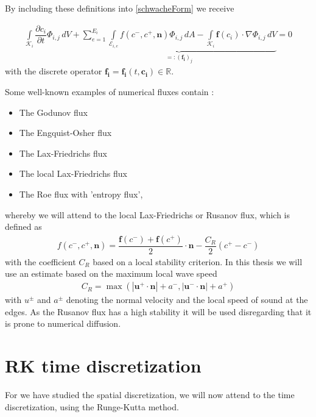 		By including these definitions into \eqref{schwacheForm} we receive
		
		\begin{align}
			\int\limits_{\mathcal{K}_i} \dfrac{\partial c_i}{\partial t}\Phi_{i,j} \, dV +
			\underbrace{\sum_{e=1}^{E_i}\int\limits_{\mathcal{E}_{i,e}} f \left( c^-, c^+, \mathbf{n} \right) \Phi_{i,j} \, dA - \int\limits_{\mathcal{K}_i} \boldsymbol{f}\left(c_i\right) \cdot \nabla\Phi_{i,j} \, dV}_{=:(\mathbf{f_i})_j} = 0
			\label{schwacheFormFlux}
		\end{align}
		with the discrete operator $\mathbf{f_i}=\mathbf{f_i}(t, \mathbf{c_i})\in\mathbb{R}$.
		
		Some well-known examples of numerical fluxes contain \cite{Cockburn1998}:
		\begin{itemize}
			\item The Godunov flux 
			\item The Engquist-Osher flux
			\item The Lax-Friedrichs flux
			\item The local Lax-Friedrichs flux
			\item The Roe flux with 'entropy flux',
		\end{itemize}
		whereby we will attend to the local Lax-Friedrichs or Rusanov flux, which is defined as
		\begin{align}
			f(c^-, c^+, \mathbf{n}) = \dfrac{\mathbf{f}(c^-)+\mathbf{f}(c^+)}{2} \cdot \mathbf{n} -\dfrac{C_R}{2}(c^+-c^-)
		\end{align}
		with the coefficient $C_R$ based on a local stability criterion. In this thesis we will use an estimate based on the maximum local wave speed
		\begin{align}
			C_R = \max(|\mathbf{u^+}\cdot \mathbf{n}|+a^-,|\mathbf{u^-}\cdot \mathbf{n}|+a^+)
		\end{align}
		with $u^\pm$ and $a^\pm$ denoting the normal velocity and the local speed of sound at the edges.
		As the Rusanov flux has a high stability it will be used disregarding that it is prone to numerical diffusion.
		
	\section{RK time discretization}
	For we have studied the spatial discretization, we will now attend to the time discretization, using the Runge-Kutta method.\\\\

